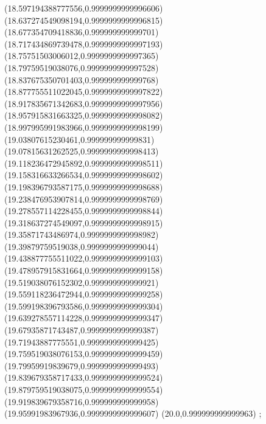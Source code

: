 {(18.597194388777556,0.9999999999996606)
(18.637274549098194,0.9999999999996815)
(18.677354709418836,0.999999999999701)
(18.717434869739478,0.9999999999997193)
(18.75751503006012,0.9999999999997365)
(18.79759519038076,0.9999999999997528)
(18.837675350701403,0.999999999999768)
(18.877755511022045,0.9999999999997822)
(18.917835671342683,0.9999999999997956)
(18.957915831663325,0.9999999999998082)
(18.997995991983966,0.9999999999998199)
(19.03807615230461,0.999999999999831)
(19.07815631262525,0.9999999999998413)
(19.118236472945892,0.9999999999998511)
(19.158316633266534,0.9999999999998602)
(19.198396793587175,0.9999999999998688)
(19.238476953907814,0.9999999999998769)
(19.278557114228455,0.9999999999998844)
(19.318637274549097,0.9999999999998915)
(19.35871743486974,0.9999999999998982)
(19.39879759519038,0.9999999999999044)
(19.438877755511022,0.9999999999999103)
(19.478957915831664,0.9999999999999158)
(19.519038076152302,0.999999999999921)
(19.559118236472944,0.9999999999999258)
(19.599198396793586,0.9999999999999304)
(19.639278557114228,0.9999999999999347)
(19.67935871743487,0.9999999999999387)
(19.71943887775551,0.9999999999999425)
(19.759519038076153,0.9999999999999459)
(19.79959919839679,0.9999999999999493)
(19.839679358717433,0.9999999999999524)
(19.879759519038075,0.9999999999999554)
(19.919839679358716,0.999999999999958)
(19.95991983967936,0.9999999999999607)
(20.0,0.999999999999963)
};
